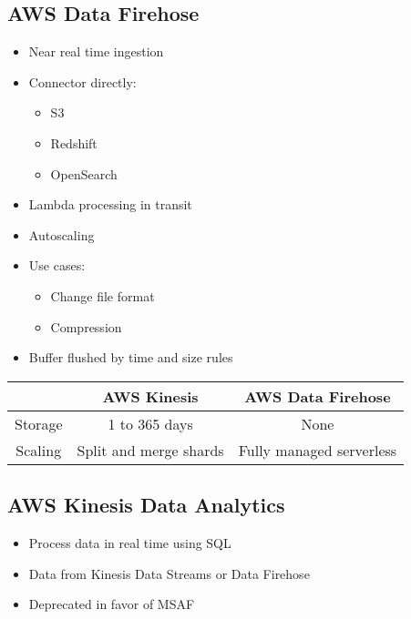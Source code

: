 \documentclass[../../main.tex]{subfiles}
\begin{document}
\subsection{AWS Data Firehose}
\begin{itemize}
    \item Near real time ingestion
    \item Connector directly:
    \begin{itemize}
        \item S3
        \item Redshift
        \item OpenSearch
    \end{itemize}
    \item Lambda processing in transit
    \item Autoscaling
    \item Use cases:
    \begin{itemize}
        \item Change file format
        \item Compression
    \end{itemize}
    \item Buffer flushed by time and size rules
\end{itemize}

\begin{center}
    \begin{tabular}{ |c|c|c| }
    \hline
    & AWS Kinesis & AWS Data Firehose \\
    \hline
    Storage & 1 to 365 days & None \\
    \hline
    Scaling & Split and merge shards & Fully managed serverless \\
    \hline
    \end{tabular}
\end{center}

\subsection{AWS Kinesis Data Analytics}
\begin{itemize}
    \item Process data in real time using SQL
    \item Data from Kinesis Data Streams or Data Firehose
    \item Deprecated in favor of MSAF
\end{itemize}
\end{document}
